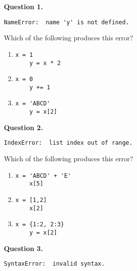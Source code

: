 \documentclass[12pt]{article}
\begin{document}


{\bf Question 1.}     \begin{lstlisting}[frame=single]
NameError:  name 'y' is not defined.
 \end{lstlisting}

Which of the following produces this error?

\begin{enumerate}[label=\Alph*]
 \item
  	\begin{lstlisting}[frame=single]
	x = 1
	y = x * 2
    \end{lstlisting}
 \item
	\begin{lstlisting}[frame=single]
	x = 0
	y += 1
    \end{lstlisting}
 \item
	\begin{lstlisting}[frame=single]
	x = 'ABCD'
	y = x[2]
	 \end{lstlisting}
\end{enumerate}

{\bf Question 2.}     \begin{lstlisting}[frame=single]
IndexError:  list index out of range.
\end{lstlisting}

Which of the following produces this error?

\begin{enumerate}[label=\Alph*]
	\item
	\begin{lstlisting}[frame=single]
	x = 'ABCD' + 'E'
	x[5]
	\end{lstlisting}
	\item
	\begin{lstlisting}[frame=single]
	x = [1,2]
	x[2]
	\end{lstlisting}
	\item
	\begin{lstlisting}[frame=single]
	x = {1:2, 2:3}
	y = x[2]
   \end{lstlisting}
\end{enumerate}

{\bf Question 3.} 
\begin{lstlisting}[frame=single]
SyntaxError:  invalid syntax.
   \end{lstlisting}
\end{document}
